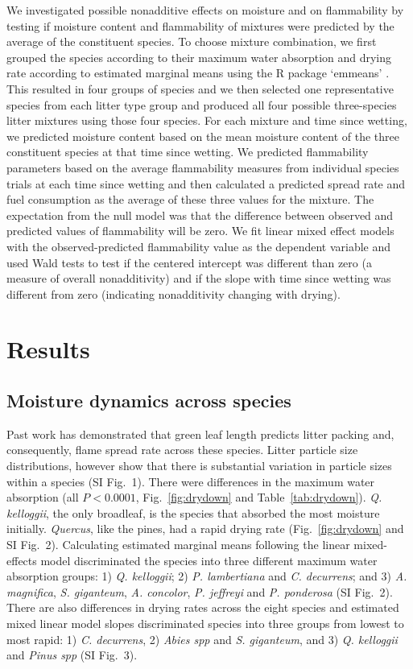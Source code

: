 \documentclass[letterpaper,12pt]{article}
\begin{document}
We investigated possible nonadditive effects on moisture and on flammability by
testing if moisture content and flammability of mixtures were predicted by the
average of the constituent species. To choose mixture combination, we first
grouped the species according to their maximum water absorption and drying rate
according to estimated marginal means using the R package `emmeans'
\citep{Lenth-2019}. This resulted in four groups of species and we then
selected one representative species from each litter type group and produced
all four possible three-species litter mixtures using those four species. For
each mixture and time since wetting, we predicted moisture content based on the
mean moisture content of the three constituent species at that time since
wetting. We predicted flammability parameters based on the average flammability
measures from individual species trials at each time since wetting and then
calculated a predicted spread rate and fuel consumption as the average of these
three values for the mixture. The expectation from the null model was that the
difference between observed and predicted values of flammability will be zero.
We fit linear mixed effect models with the observed-predicted flammability
value as the dependent variable and used Wald tests to test if the centered
intercept was different than zero (a measure of overall nonadditivity) and if
the slope with time since wetting was different from zero (indicating
nonadditivity changing with drying).

\section*{Results}

\subsection*{Moisture dynamics across species}

Past work has demonstrated that green leaf length predicts litter packing and,
consequently, flame spread rate across these species. Litter particle size
distributions, however show that there is substantial variation in particle
sizes within a species (SI Fig.~1). There were differences in the maximum water
absorption (all $P < 0.0001$, Fig.~\ref{fig:drydown} and
Table~\ref{tab:drydown}). \emph{Q. kelloggii}, the only broadleaf, is the
species that absorbed the most moisture initially. \emph{Quercus}, like the
pines, had a rapid drying rate (Fig.~\ref{fig:drydown} and SI Fig.~2).
Calculating estimated marginal means following the linear mixed-effects model
discriminated the species into three different maximum water absorption groups:
1) \emph{Q. kelloggii}; 2) \emph{P. lambertiana} and \emph{C. decurrens}; and
3) \emph{A. magnifica}, \emph{S. giganteum}, \emph{A. concolor}, \emph{P.
  jeffreyi} and \emph{P. ponderosa} (SI Fig.~2). There are also differences in
drying rates across the eight species and estimated mixed linear model slopes
discriminated species into three groups from lowest to most rapid: 1) \emph{C.
  decurrens}, 2) \emph{Abies spp} and \emph{S. giganteum}, and 3) \emph{Q.
  kelloggii} and \emph{Pinus spp} (SI Fig.~3).
\end{document}
